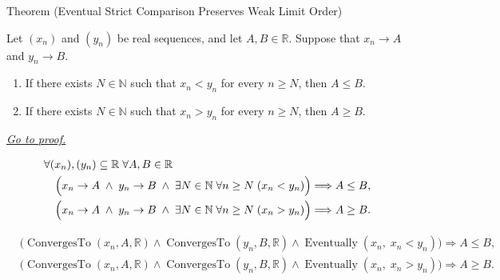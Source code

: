 \begin{theorembox}{Theorem (Eventual Strict Comparison Preserves Weak Limit Order)}
\begin{theorem}
\label{thm:eventual-strict-comparison-preserves-weak-limit-order}

Let $(x_n)$ and $(y_n)$ be real sequences, and let $A,B\in\mathbb{R}$.
Suppose that $x_n\to A$ and $y_n\to B$.
\begin{enumerate}[label=(\alph*)]
  \item If there exists $N\in\mathbb{N}$ such that $x_n<y_n$ for every
  $n\ge N$, then $A\le B$.
  \item If there exists $N\in\mathbb{N}$ such that $x_n>y_n$ for every
  $n\ge N$, then $A\ge B$.
\end{enumerate}

\smallskip
\noindent
\hyperref[prf:eventual-strict-comparison-preserves-weak-limit-order]{\textit{Go to proof.}}
\end{theorem}
\end{theorembox}

\begin{remark*}
\[
\begin{aligned}
&\forall (x_n),(y_n)\subseteq\mathbb{R}\;\forall A,B\in\mathbb{R}\\
&\quad\Bigl(
  x_n\to A
  \;\land\;
  y_n\to B
  \;\land\;
  \exists N\in\mathbb{N}\;\forall n\ge N\;(x_n<y_n)
\Bigr)
\Longrightarrow A\le B,\\
&\quad\Bigl(
  x_n\to A
  \;\land\;
  y_n\to B
  \;\land\;
  \exists N\in\mathbb{N}\;\forall n\ge N\;(x_n>y_n)
\Bigr)
\Longrightarrow A\ge B.
\end{aligned}
\]
\end{remark*}

\begin{remark*}
\[
\begin{aligned}
&\bigl(
\operatorname{ConvergesTo}(x_n,A,\mathbb{R})
\land
\operatorname{ConvergesTo}(y_n,B,\mathbb{R})
\land
\operatorname{Eventually}(x_n,\;x_n<y_n)
\bigr)
\Longrightarrow A\le B,\\
&\bigl(
\operatorname{ConvergesTo}(x_n,A,\mathbb{R})
\land
\operatorname{ConvergesTo}(y_n,B,\mathbb{R})
\land
\operatorname{Eventually}(x_n,\;x_n>y_n)
\bigr)
\Longrightarrow A\ge B.
\end{aligned}
\]
\end{remark*}

